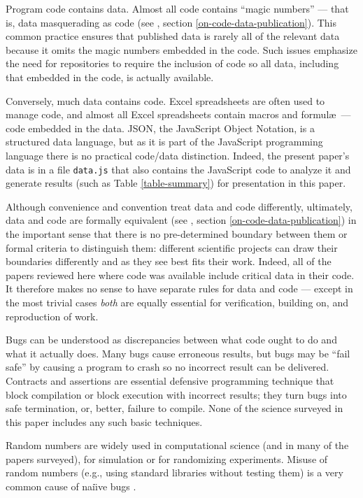 \documentclass{comjnl}
\begin{document}
Program code contains data. Almost all code contains ``magic numbers'' --- that is, data masquerading as code (see \supplement, section \ref{on-code-data-publication}). This common practice ensures that published data is rarely all of the relevant data because it omits the magic numbers embedded in the code. Such issues emphasize the need for repositories to require the inclusion of code so all data, including that embedded in the code, is actually available. 

Conversely, much data contains code. Excel spreadsheets are often used to manage code, and almost all Excel spreadsheets contain macros and formul\ae\ --- code embedded in the data. JSON, the JavaScript Object Notation, is a structured data language, but as it is part of the JavaScript programming language there is no practical code/data distinction. Indeed, the present paper's data is in a file \texttt{data.js} that also contains the JavaScript code to analyze it and generate results (such as Table \ref{table-summary}) for presentation in this paper.

Although convenience and convention treat data and code differently, ultimately, data and code are formally equivalent (see \supplement, section \ref{on-code-data-publication}) in the important sense that there is no pre-determined boundary between them or formal criteria to distinguish them: different scientific projects can draw their boundaries differently and as they see best fits their work. Indeed, all of the papers reviewed here where code was available include critical data in their code. It therefore makes no sense to have separate rules for data and code --- except in the most trivial cases \emph{both\/} are equally essential for verification, building on, and reproduction of work. 

Bugs can be understood as discrepancies between what code ought to do and what it actually does. Many bugs cause erroneous results, but bugs may be ``fail safe'' by causing a program to crash so no incorrect result can be delivered. Contracts and assertions are essential defensive programming technique that block compilation or block execution with incorrect results; they turn bugs into safe termination, or, better, failure to compile. None of the science surveyed in this paper includes any such basic techniques. 

Random numbers are widely used in computational science (and in many of the papers surveyed), for simulation or for randomizing experiments. Misuse of random numbers (e.g., using standard libraries without testing them) is a very common cause of nai\"\i ve bugs \cite{knuth}.
\end{document}
